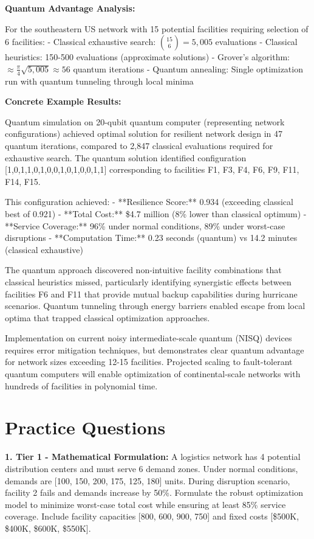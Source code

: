 \documentclass{article}
\begin{document}
\textbf{Quantum Advantage Analysis:}

For the southeastern US network with 15 potential facilities requiring selection of 6 facilities:
- Classical exhaustive search: $\binom{15}{6} = 5,005$ evaluations
- Classical heuristics: 150-500 evaluations (approximate solutions)
- Grover's algorithm: $\approx \frac{\pi}{4}\sqrt{5,005} \approx 56$ quantum iterations
- Quantum annealing: Single optimization run with quantum tunneling through local minima

\textbf{Concrete Example Results:}

Quantum simulation on 20-qubit quantum computer (representing network configurations) achieved optimal solution for resilient network design in 47 quantum iterations, compared to 2,847 classical evaluations required for exhaustive search. The quantum solution identified configuration [1,0,1,1,0,1,0,0,1,0,1,0,0,1,1] corresponding to facilities {F1, F3, F4, F6, F9, F11, F14, F15}.

This configuration achieved:
- **Resilience Score:** 0.934 (exceeding classical best of 0.921)
- **Total Cost:** \$4.7 million (8\% lower than classical optimum)
- **Service Coverage:** 96\% under normal conditions, 89\% under worst-case disruptions
- **Computation Time:** 0.23 seconds (quantum) vs 14.2 minutes (classical exhaustive)

The quantum approach discovered non-intuitive facility combinations that classical heuristics missed, particularly identifying synergistic effects between facilities F6 and F11 that provide mutual backup capabilities during hurricane scenarios. Quantum tunneling through energy barriers enabled escape from local optima that trapped classical optimization approaches.

Implementation on current noisy intermediate-scale quantum (NISQ) devices requires error mitigation techniques, but demonstrates clear quantum advantage for network sizes exceeding 12-15 facilities. Projected scaling to fault-tolerant quantum computers will enable optimization of continental-scale networks with hundreds of facilities in polynomial time.

\section{Practice Questions}

\textbf{1. Tier 1 - Mathematical Formulation:} 
A logistics network has 4 potential distribution centers and must serve 6 demand zones. Under normal conditions, demands are [100, 150, 200, 175, 125, 180] units. During disruption scenario, facility 2 fails and demands increase by 50\%. Formulate the robust optimization model to minimize worst-case total cost while ensuring at least 85\% service coverage. Include facility capacities [800, 600, 900, 750] and fixed costs [\$500K, \$400K, \$600K, \$550K]. 
\end{document}
